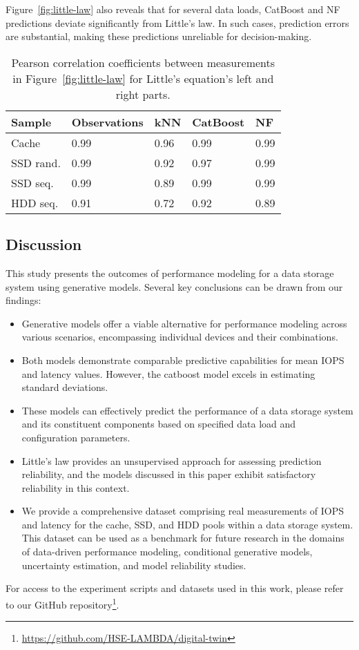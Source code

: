Figure~\ref{fig:little-law} also reveals that for several data loads, CatBoost and NF predictions deviate significantly from Little's law. In such cases, prediction errors are substantial, making these predictions unreliable for decision-making.

\begin{table}[t]
\caption{Pearson correlation coefficients between measurements in Figure~\ref{fig:little-law} for Little's equation's left and right parts.}
\small
\begin{tabularx}{\linewidth}{X@{}X@{}X@{}X@{}X@{}}
\hline
Sample & 
Observations & 
kNN & 
CatBoost &
NF \\
\hline
Cache     & 0.99  & 0.96    & 0.99    & 0.99 \\ 
SSD rand. & 0.99  & 0.92    & 0.97    & 0.99 \\
SSD seq.  & 0.99  & 0.89    & 0.99    & 0.99 \\
HDD seq.  & 0.91  & 0.72    & 0.92    & 0.89 \\
\hline
\end{tabularx}
\label{tab:pearson}
\end{table}


\subsection{Discussion}

This study presents the outcomes of performance modeling for a data storage system using generative models. Several key conclusions can be drawn from our findings:

\begin{itemize}

\item Generative models offer a viable alternative for performance modeling across various scenarios, encompassing individual devices and their combinations.

\item Both models demonstrate comparable predictive capabilities for mean IOPS and latency values. However, the catboost model excels in estimating standard deviations.

\item These models can effectively predict the performance of a data storage system and its constituent components based on specified data load and configuration parameters.

\item Little's law provides an unsupervised approach for assessing prediction reliability, and the models discussed in this paper exhibit satisfactory reliability in this context.

\item We provide a comprehensive dataset comprising real measurements of IOPS and latency for the cache, SSD, and HDD pools within a data storage system. This dataset can be used as a benchmark for future research in the domains of data-driven performance modeling, conditional generative models, uncertainty estimation, and model reliability studies.

\end{itemize}

For access to the experiment scripts and datasets used in this work, please refer to our GitHub repository\footnote{\url{https://github.com/HSE-LAMBDA/digital-twin}}.